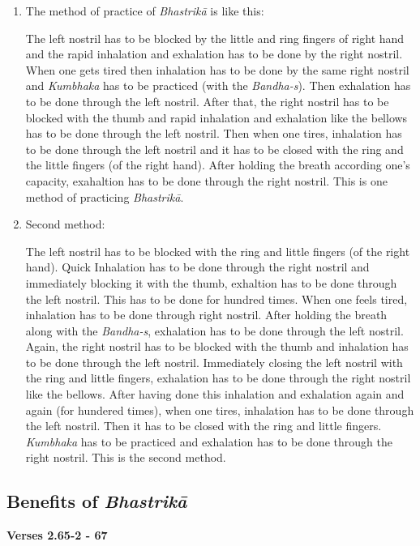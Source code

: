 \begin{enumerate}
\item The method of practice of \textit{Bhastrikā} is like this:

The left nostril has to be blocked by the little and ring fingers of right hand and the rapid inhalation and exhalation has to be done by the right nostril. When one gets tired then inhalation has to be done by the same right nostril and \textit{Kumbhaka} has to be practiced (with the \textit{Bandha-s}). Then exhalation has to be done through the left nostril. After that, the right nostril has to be blocked with the thumb and rapid inhalation and exhalation like the bellows has to be done through the left nostril. Then when one tires, inhalation has to be done through the left nostril and it has to be closed with the ring and the little fingers (of the right hand). After holding the breath according one’s capacity, exahaltion has to be done through the right nostril. This is one method of practicing \textit{Bhastrikā}.
 
\item Second method:

The left nostril has to be blocked with the ring and little fingers (of the right hand). Quick Inhalation has to be done through the right nostril and immediately blocking it with the thumb, exhaltion has to be done through the left nostril.  This has to be done for hundred times. When one feels tired, inhalation has to be done through right nostril. After holding the breath along with the \textit{Bandha-s}, exhalation has to be done through the left nostril. Again, the right nostril has to be blocked with the thumb and inhalation has to be done through the left nostril. Immediately closing the left nostril with the ring and little fingers, exhalation has to be done through the right nostril like the bellows. After having done this inhalation and exhalation again and again (for hundered times), when one tires, inhalation has to be done through the left nostril. Then it has to be closed with the ring and little fingers. \textit{Kumbhaka} has to be practiced and exhalation has to be done through the right nostril. This is the second method. 
\end{enumerate}
\newpage

\subsection*{Benefits of \textit{Bhastrikā}}


\noindent \textbf{Verses 2.65-2 - 67}

